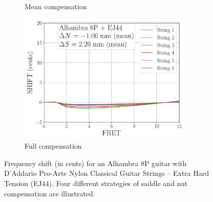 \begin{figure}
\begin{subfigure}[b]{0.45\textwidth}
   \caption{Mean compensation}
   \label{fig:shift_alhambra8p_ej44_mean}
  \end{subfigure}
  \hspace{0.25in}
  \begin{subfigure}[b]{0.45\textwidth}
   \centering
   \includegraphics[width=3.25in]{figures/shift_alhambra8p_ej44_full}
   \caption{Full compensation}
   \label{fig:shift_alhambra8p_ej44_full}
  \end{subfigure}
  \caption{\label{fig:compensation} Frequency shift (in cents) for an Alhambra 8P guitar with D'Addario Pro-Arte Nylon Classical Guitar Strings -- Extra Hard Tension (EJ44). Four different strategies of saddle and nut compensation are illustrated.}
 \end{figure}


